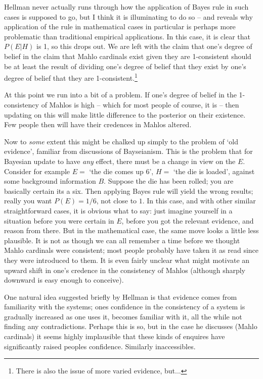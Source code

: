 \documentclass{asl}
\theoremstyle{definition}
\begin{document}
Hellman never actually runs through how the application of Bayes rule in such cases is supposed to go, but I think it is illuminating to do so -- and reveals why application of the rule in mathematical cases in particular is perhaps more problematic than traditional empirical applications. In this case, it is clear that $P(E|H)$ is 1, so this drops out. We are left with the claim that one's degree of belief in the claim that Mahlo cardinals exist given they are 1-consistent should be at least the result of dividing one's degree of belief that they exist by one's degree of belief that they are 1-consistent.\footnote{There is also the issue of more varied evidence, but...}

At this point we run into a bit of a problem. If one's degree of belief in the 1-consistency of Mahlos is high -- which for most people of course, it is -- then updating on this will make little difference to the posterior on their existence. Few people then will have their credences in Mahlos altered.

Now to \emph{some} extent this might be chalked up simply to the problem of `old evidence', familiar from discussions of Bayseianism. This is the problem that for Bayesian update to have \emph{any} effect, there must be a change in view on the $E$. Consider for example $E =$ `the die comes up 6', $H =$ `the die is loaded', against some background information $B$. Suppose the die has been rolled; you are basically certain its a six. Then applying Bayes rule will yield the wrong results; really you want $P(E) = 1/6$, not close to $1$. In this case, and with other similar straightforward cases, it is obvious what to say: just imagine yourself in a situation before you were certain in $E$, before you got the relevant evidence, and reason from there. But in the mathematical case, the same move looks a little less plausible. It is not as though we can all remember a time before we thought Mahlo cardinals were consistent; most people probably have taken it as read since they were introduced to them. It is even fairly unclear what might motivate an upward shift in one's credence in the consistency of Mahlos (although sharply downward is easy enough to conceive).

One natural idea suggested briefly by Hellman is that evidence comes from familiarity with the systems; ones confidence in the consistency of a system is gradually increased as one uses it, becomes familiar with it, all the while not finding any contradictions. Perhaps this is so, but in the case he discusses (Mahlo cardinals) it seems highly implausible that these kinds of enquires have significantly raised peoples confidence. Similarly inaccessibles.
\end{document}
